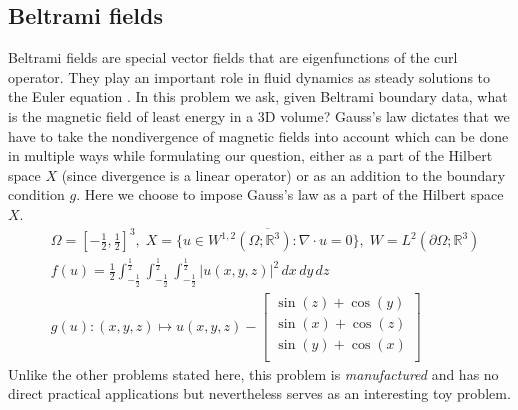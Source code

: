 \subsection{Beltrami fields} Beltrami fields are special vector fields that are eigenfunctions of the curl operator. They play an important role in fluid dynamics as steady solutions to the Euler equation \cite{aris2012vectors}. In this problem we ask, given Beltrami boundary data, what is the magnetic field of least energy in a 3D volume? Gauss's law \cite{jackson1999classical} dictates that we have to take the nondivergence of magnetic fields into account which can be done in multiple ways while formulating our question, either as a part of the Hilbert space $X$ (since divergence is a linear operator) or as an addition to the boundary condition $g$. Here we choose to impose Gauss's law as a part of the Hilbert space $X$.
\begin{equation}
    \begin{aligned}
&\Omega = \left[-\frac{1}{2}, \frac{1}{2}\right]^3,\; X=\overline{\{u\in W^{1,2}(\Omega; \mathbb R^3):\nabla\cdot u=0\}},\;W=L^{2}(\partial\Omega;\mathbb R^3)\\
    &f(u) = \frac{1}{2}\int_{-\frac{1}{2}}^{\frac{1}{2}}\int_{-\frac{1}{2}}^{\frac{1}{2}}\int_{-\frac{1}{2}}^{\frac{1}{2}}|u(x, y, z)|^2\,dx\,dy\,dz\\
    & g(u): (x, y, z)\mapsto u(x, y, z) - \begin{bmatrix}
\sin(z) + \cos(y) \\
\sin(x) + \cos(z) \\
\sin(y) + \cos(x) \\
\end{bmatrix}
    \end{aligned}
\end{equation}
Unlike the other problems stated here, this problem is \textit{manufactured} and has no direct practical applications but nevertheless serves as an interesting toy problem.